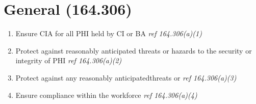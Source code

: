 \documentclass[../main.tex]{subfiles}
\begin{document}
\section{General (164.306)}
\begin{enumerate}
    \item{Ensure CIA for all PHI held by CI or BA \emph{ref 164.306(a)(1)}}\cite{us}
    \item{Protect against reasonably anticipated threats or hazards to the security or integrity of PHI \emph{ref 164.306(a)(2)}}\cite{us}
    \item{Protect against any reasonably anticipatedthreats or \emph{ref 164.306(a)(3)}}\cite{us}
    \item{Ensure compliance within the workforce \emph{ref 164.306(a)(4)}}\cite{us}
\end{enumerate}
\end{document}
